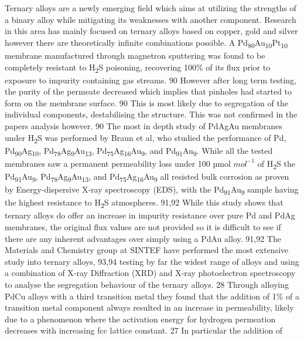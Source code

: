 Ternary alloys are a newly emerging field which aims at utilizing the strengths of a binary 
alloy while mitigating its weaknesses with another component. Research in this area has 
mainly focused on ternary alloys based on copper, gold and silver however there are 
theoretically infinite combinations possible. 
A Pd\textsubscript{80}Au\textsubscript{10}Pt\textsubscript{10} membrane manufactured through 
magnetron sputtering was found to be completely resistant to H\textsubscript{2}S poisoning, 
recovering 100\% of its flux prior to exposure to impurity containing gas streams. 90 
However after long term testing, the purity of the permeate decreased which implies that 
pinholes had started to form on the membrane surface. 90 This is most likely due to 
segregation of the individual components, destabilising the structure. This was not 
confirmed in the papers analysis however. 90 The most in depth study of PdAgAu membranes 
under H\textsubscript{2}S was performed by Braun et al, who studied the performance of Pd, 
Pd\textsubscript{90}Ag\textsubscript{10}, Pd\textsubscript{78}Ag\textsubscript{9}Au\textsubscript{13}, 
Pd\textsubscript{75}Ag\textsubscript{16}Au\textsubscript{9}, and Pd\textsubscript{91}Au\textsubscript{9}. 
While all the tested membranes saw a permanent permeability loss under 100 µmol $mol^{-1}$ 
of H\textsubscript{2}S the Pd\textsubscript{91}Au\textsubscript{9}, Pd\textsubscript{78}Ag\textsubscript{9}Au\textsubscript{13}, 
and Pd\textsubscript{75}Ag\textsubscript{16}Au\textsubscript{9} all resisted bulk corrosion 
as proven by Energy-dispersive X-ray spectroscopy (EDS), with the Pd\textsubscript{91}Au\textsubscript{9} 
sample having the highest resistance to H\textsubscript{2}S atmospheres. 91,92 While this 
study shows that ternary alloys do offer an increase in impurity resistance over pure Pd and 
PdAg membranes, the original flux values are not provided so it is difficult to see if 
there are any inherent advantages over simply using a PdAu alloy. 91,92 The Materials 
and Chemistry group at SINTEF have performed the most extensive study into ternary 
alloys, 93,94 testing by far the widest range of alloys and using a combination  of X-ray 
Diffraction (XRD) and X-ray photoelectron spectroscopy to analyse the segregation behaviour 
of the ternary alloys. 28 Through alloying PdCu alloys with a third transition metal they 
found that the addition of 1\% of a transition metal component always resulted in an increase 
in permeability, likely due to a phenomenon where the activation energy for hydrogen 
permeation decreases with increasing fcc lattice constant. 27 In particular the addition of 
